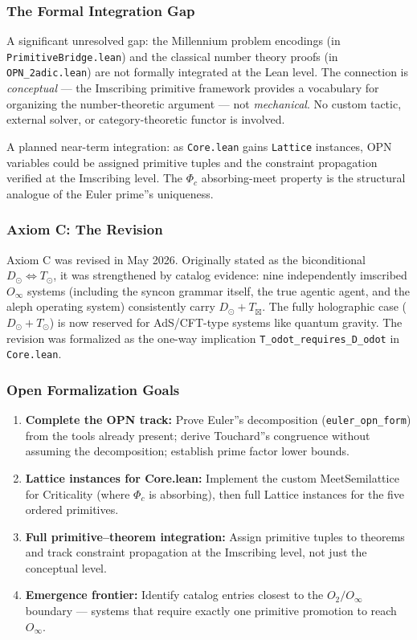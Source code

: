 \documentclass[12pt,a4paper]{article}
\begin{document}
\subsubsection{The Formal Integration Gap}

A significant unresolved gap: the Millennium problem encodings (in \texttt{PrimitiveBridge.lean}) and the classical number theory proofs (in \texttt{OPN\_2adic.lean}) are not formally integrated at the Lean level. The connection is \emph{conceptual} --- the Imscribing primitive framework provides a vocabulary for organizing the number-theoretic argument --- not \emph{mechanical}. No custom tactic, external solver, or category-theoretic functor is involved.

A planned near-term integration: as \texttt{Core.lean} gains \texttt{Lattice} instances, OPN variables could be assigned primitive tuples and the constraint propagation verified at the Imscribing level. The $\Phi_c$ absorbing-meet property is the structural analogue of the Euler prime''s uniqueness.

\subsubsection{Axiom C: The Revision}

Axiom C was revised in May 2026. Originally stated as the biconditional $D_{\odot} \iff T_{\odot}$, it was strengthened by catalog evidence: nine independently imscribed $O_{\infty}$ systems (including the syncon grammar itself, the true agentic agent, and the aleph operating system) consistently carry $D_{\odot} + T_{\boxtimes}$. The fully holographic case ($D_{\odot} + T_{\odot}$) is now reserved for AdS/CFT-type systems like quantum gravity. The revision was formalized as the one-way implication \texttt{T\_odot\_requires\_D\_odot} in \texttt{Core.lean}.

\subsubsection{Open Formalization Goals}

\begin{enumerate}
    \item \textbf{Complete the OPN track:} Prove Euler''s decomposition (\texttt{euler\_opn\_form}) from the tools already present; derive Touchard''s congruence without assuming the decomposition; establish prime factor lower bounds.
    \item \textbf{Lattice instances for Core.lean:} Implement the custom MeetSemilattice for Criticality (where $\Phi_c$ is absorbing), then full Lattice instances for the five ordered primitives.
    \item \textbf{Full primitive--theorem integration:} Assign primitive tuples to theorems and track constraint propagation at the Imscribing level, not just the conceptual level.
    \item \textbf{Emergence frontier:} Identify catalog entries closest to the $O_2 / O_{\infty}$ boundary --- systems that require exactly one primitive promotion to reach $O_{\infty}$.
\end{enumerate}
\end{document}
